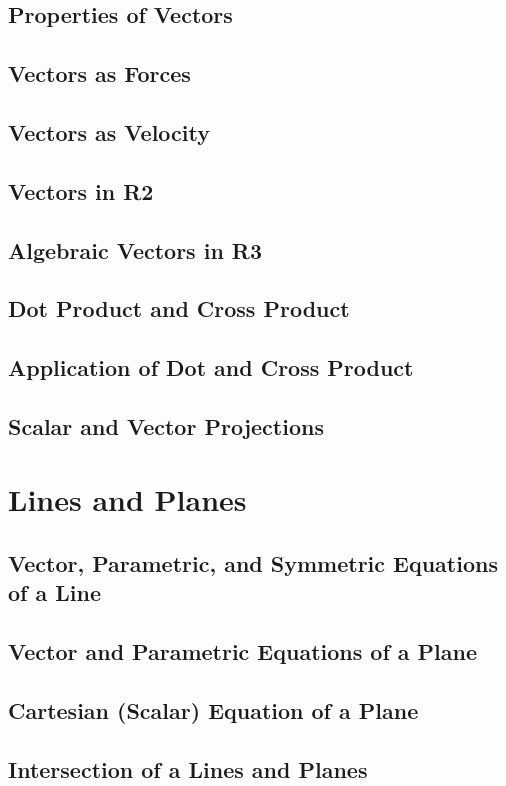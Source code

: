 \documentclass[12.5pt]{article}
\begin{document}
        \subsection{Properties of Vectors}
        \subsection{Vectors as Forces}
        \subsection{Vectors as Velocity}
        \subsection{Vectors in R2}
        \subsection{Algebraic Vectors in R3}
        \subsection{Dot Product and Cross Product}
        \subsection{Application of Dot and Cross Product}
        \subsection{Scalar and Vector Projections}
    \section{Lines and Planes}
        \subsection{Vector, Parametric, and Symmetric Equations of a Line}
        \subsection{Vector and Parametric Equations of a Plane}
        \subsection{Cartesian (Scalar) Equation of a Plane}
        \subsection{Intersection of a Lines and Planes}
\end{document}
